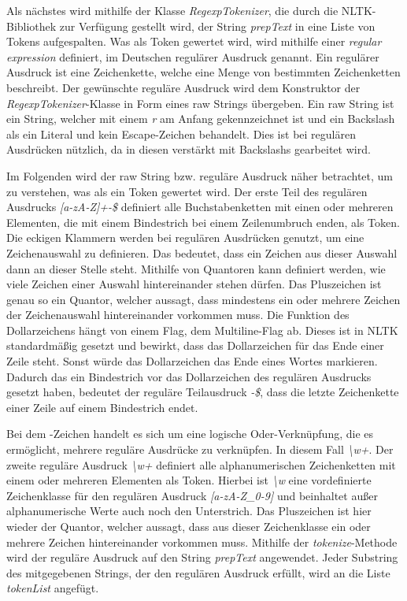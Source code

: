 Als nächstes wird mithilfe der Klasse \textit{RegexpTokenizer}, die durch die NLTK-Bibliothek zur Verfügung gestellt wird, der String \textit{prepText} in eine Liste von Tokens aufgespalten. Was als Token gewertet wird, wird mithilfe einer \textit{regular expression} definiert, im Deutschen regulärer Ausdruck genannt. Ein regulärer Ausdruck ist eine Zeichenkette, welche eine Menge von bestimmten Zeichenketten beschreibt. Der gewünschte reguläre Ausdruck wird dem Konstruktor der \textit{RegexpTokenizer}-Klasse in Form eines raw Strings übergeben. Ein raw String ist ein String, welcher mit einem \textit{r} am Anfang gekennzeichnet ist und ein Backslash als ein Literal und kein Escape-Zeichen behandelt. Dies ist bei regulären Ausdrücken nützlich, da in diesen verstärkt mit Backslashs gearbeitet wird.

Im Folgenden wird der raw String bzw. reguläre Ausdruck näher betrachtet, um zu verstehen, was als ein Token gewertet wird. Der erste Teil des regulären Ausdrucks \textit{[a-zA-Z]+-\$} definiert alle Buchstabenketten mit einen oder mehreren Elementen, die mit einem Bindestrich bei einem Zeilenumbruch enden, als Token. Die eckigen Klammern werden bei regulären Ausdrücken genutzt, um eine Zeichenauswahl zu definieren. Das bedeutet, dass ein Zeichen aus dieser Auswahl dann an dieser Stelle steht. Mithilfe von Quantoren kann definiert werden, wie viele Zeichen einer Auswahl hintereinander stehen dürfen. Das Pluszeichen ist genau so ein Quantor, welcher aussagt, dass mindestens ein oder mehrere Zeichen der Zeichenauswahl hintereinander vorkommen muss. Die Funktion des Dollarzeichens hängt von einem Flag, dem Multiline-Flag ab. Dieses ist in NLTK standardmäßig gesetzt und bewirkt, dass das Dollarzeichen für das Ende einer Zeile steht.\cite{nltk} Sonst würde das Dollarzeichen das Ende eines Wortes markieren. Dadurch das ein Bindestrich vor das Dollarzeichen des regulären Ausdrucks gesetzt haben, bedeutet der reguläre Teilausdruck \textit{-\$}, dass die letzte Zeichenkette einer Zeile auf einem Bindestrich endet.

Bei dem \textbar{}-Zeichen handelt es sich um eine logische Oder-Verknüpfung, die es ermöglicht, mehrere reguläre Ausdrücke zu verknüpfen. In diesem Fall \textit{\textbackslash w+}. Der zweite reguläre Ausdruck \textit{\textbackslash w+} definiert alle alphanumerischen Zeichenketten mit einem oder mehreren Elementen als Token. Hierbei ist \textit{\textbackslash w} eine vordefinierte Zeichenklasse für den regulären Ausdruck \textit{[a-zA-Z\_0-9]} und beinhaltet außer alphanumerische Werte auch noch den Unterstrich. Das Pluszeichen ist hier wieder der Quantor, welcher aussagt, dass aus dieser Zeichenklasse ein oder mehrere Zeichen hintereinander vorkommen muss. Mithilfe der \textit{tokenize}-Methode wird der reguläre Ausdruck auf den String \textit{prepText} angewendet. Jeder Substring des mitgegebenen Strings, der den regulären Ausdruck erfüllt, wird an die Liste \textit{tokenList} angefügt.

